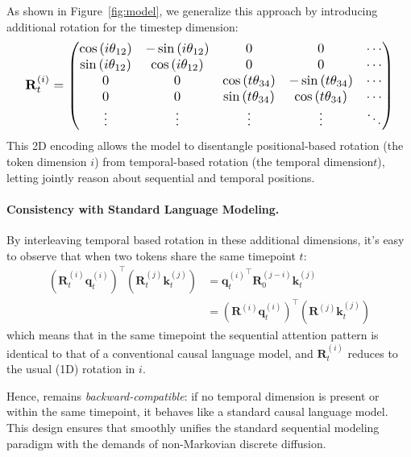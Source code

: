As shown in Figure~\ref{fig:model}, we generalize this approach by introducing additional rotation for the timestep dimension:
\begin{equation*}
\label{eq:2d_rotary}
\resizebox{.95\columnwidth}{!}{$
\mathbf{R}_t^{(i)} = \begin{pmatrix}
    \cos \left(i \theta_{12}\right) & -\sin \left(i \theta_{12}\right) & 0 & 0 & \cdots\\
    \sin \left(i \theta_{12}\right) & \cos \left(i \theta_{12}\right)  & 0 & 0 & \cdots\\
    0 & 0 & \cos \left(t \theta_{34}\right) & -\sin \left(t \theta_{34}\right) & \cdots\\
    0 & 0 & \sin \left(t \theta_{34}\right) & \cos \left(t \theta_{34}\right)  & \cdots\\
    \vdots & \vdots & \vdots & \vdots & \ddots
\end{pmatrix}
$}
\end{equation*}
This 2D encoding allows the model to disentangle positional-based rotation (the token dimension \(i\)) from temporal-based rotation (the temporal dimension\(t\)), letting \method{} jointly reason about sequential and temporal positions.

\paragraph{Consistency with Standard Language Modeling.}
By interleaving temporal based rotation in these additional dimensions, it's easy to observe that when two tokens share the same timepoint $t$:
\begin{equation*}
\begin{aligned}
\left(\mathbf{R}_t^{(i)} \mathbf{q}_t^{(i)}\right)^{\top}\left(\mathbf{R}_t^{(j)} \mathbf{k}_t^{(j)}\right) & ={\mathbf{q}_t^{(i)}}^{\top} \mathbf{R}_0^{(j-i)} \mathbf{k}_t^{(j)} \\
& =\left(\mathbf{R}^{(i)} \mathbf{q}_t^{(i)}\right)^{\top}\left(\mathbf{R}^{(j)} \mathbf{k}_t^{(j)}\right)
\end{aligned}
\end{equation*}
which means that in the same timepoint the sequential attention pattern is identical to that of a conventional causal language model, and \(\mathbf{R}_t^{(i)}\) reduces to the usual (1D) rotation in \(i\).  

Hence, \method{} remains \textit{backward-compatible}: if no temporal dimension is present or within the same timepoint, it behaves like a standard causal language model. This design ensures that \method{} smoothly unifies the standard sequential modeling paradigm with the demands of non-Markovian discrete diffusion.

